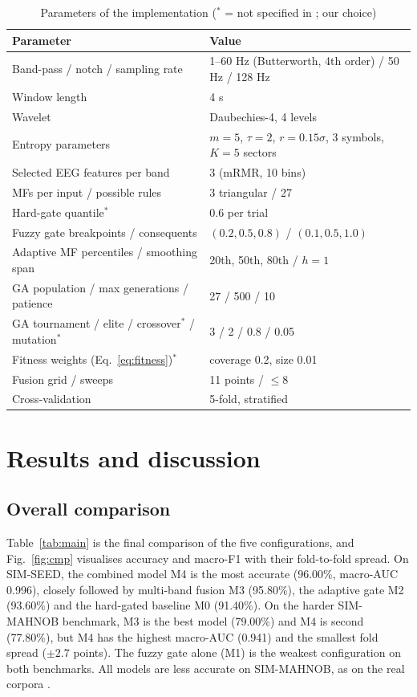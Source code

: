 \documentclass[10pt,twoside]{article}
\newcommand{\simseed}{SIM-SEED}
\newcommand{\simmah}{SIM-MAHNOB}
\begin{document}
\begin{table}[t]
\caption{Parameters of the implementation ($^\ast$ = not specified in \cite{FarhadiSedehi2024a}; our choice)}
\label{tab:params}
\footnotesize
\begin{tabularx}{\linewidth}{@{}X l@{}}
\toprule
Parameter & Value \\
\midrule
Band-pass / notch / sampling rate & 1--60 Hz (Butterworth, 4th order) / 50 Hz / 128 Hz \\
Window length & 4 s \\
Wavelet & Daubechies-4, 4 levels \\
Entropy parameters & $m=5$, $\tau=2$, $r=0.15\sigma$, 3 symbols, $K=5$ sectors \\
Selected EEG features per band & 3 (mRMR, 10 bins) \\
MFs per input / possible rules & 3 triangular / 27 \\
Hard-gate quantile$^\ast$ & 0.6 per trial \\
Fuzzy gate breakpoints / consequents & $(0.2,0.5,0.8)$ / $(0.1,0.5,1.0)$ \\
Adaptive MF percentiles / smoothing span & 20th, 50th, 80th / $h=1$ \\
GA population / max generations / patience & 27 / 500 / 10 \\
GA tournament / elite / crossover$^\ast$ / mutation$^\ast$ & 3 / 2 / 0.8 / 0.05 \\
Fitness weights (Eq.~\ref{eq:fitness})$^\ast$ & coverage 0.2, size 0.01 \\
Fusion grid / sweeps & 11 points / $\le 8$ \\
Cross-validation & 5-fold, stratified \\
\bottomrule
\end{tabularx}
\end{table}

\section{Results and discussion}\label{sec:results}
\subsection{Overall comparison}
Table~\ref{tab:main} is the final comparison of the five configurations, and Fig.~\ref{fig:cmp} visualises accuracy and macro-F1 with their fold-to-fold spread. On \simseed{}, the combined model M4 is the most accurate (96.00\%, macro-AUC 0.996), closely followed by multi-band fusion M3 (95.80\%), the adaptive gate M2 (93.60\%) and the hard-gated baseline M0 (91.40\%). On the harder \simmah{} benchmark, M3 is the best model (79.00\%) and M4 is second (77.80\%), but M4 has the highest macro-AUC (0.941) and the smallest fold spread ($\pm2.7$ points). The fuzzy gate alone (M1) is the weakest configuration on both benchmarks. All models are less accurate on \simmah{}, as on the real corpora \cite{FarhadiSedehi2024a}.
\end{document}
